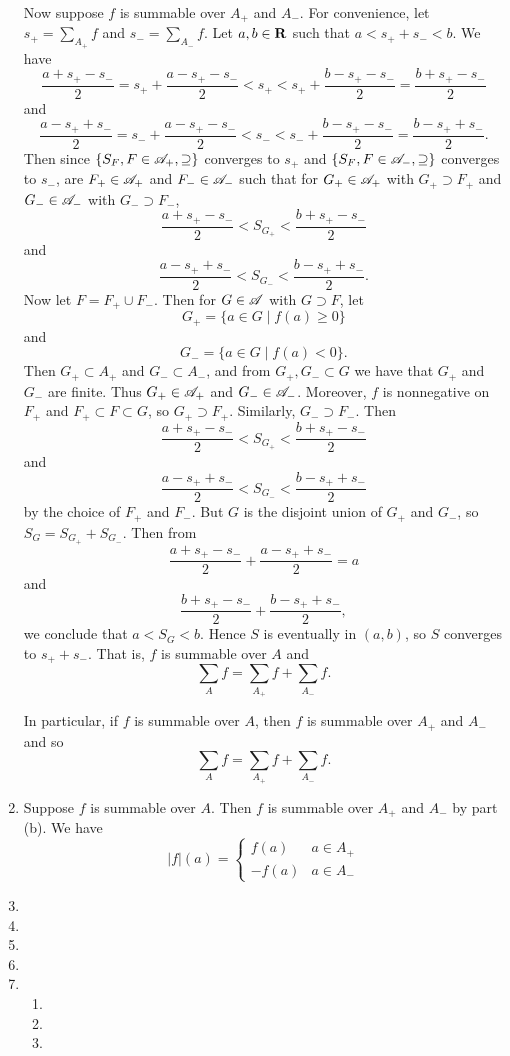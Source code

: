 \begin{prob}
\begin{enumerate}
Now suppose $f$ is summable over $A_+$ and $A_-$. For convenience, let $s_+ = \sum_{A_+}f$ and $s_- = \sum_{A_-}f$. Let $a, b \in \mathbf{R}$ such that $a < s_+ + s_- < b$. We have \[\frac{a + s_+ - s_-}{2} =  s_+ + \frac{a - s_+ - s_-}{2}  < s_+ < s_+ + \frac{b - s_+ - s_-}{2} = \frac{b + s_+ - s_-}{2}\] and \[\frac{a - s_+ + s_-}{2} = s_- + \frac{a - s_+ - s_-}{2} < s_- < s_- + \frac{b - s_+ - s_-}{2} = \frac{b - s_+ + s_-}{2}.\] Then since $\{S_F, F \in \mathscr{A}_+, \supseteq\}$ converges to $s_+$ and $\{S_F, F \in \mathscr{A}_-, \supseteq\}$ converges to $s_-$, are $F_+ \in \mathscr{A}_+$ and $F_- \in \mathscr{A}_-$ such that for $G_+ \in \mathscr{A}_+$ with $G_+ \supset F_+$ and $G_- \in \mathscr{A}_-$ with $G_- \supset F_-$, \[\frac{a + s_+ - s_-}{2} < S_{G_+} < \frac{b + s_+ - s_-}{2}\] and \[\frac{a - s_+ + s_-}{2} < S_{G_-} < \frac{b - s_+ + s_-}{2}.\] Now let $F = F_+ \cup F_-$. Then for $G \in \mathscr{A}$ with $G \supset F$, let \[G_+ = \{a \in G\mid f(a) \geq 0\}\] and \[G_- = \{a \in G\mid f(a) < 0\}.\] Then $G_+ \subset A_+$ and $G_- \subset A_-$, and from $G_+, G_- \subset G$ we have that $G_+$ and $G_-$ are finite. Thus $G_+ \in \mathscr{A}_+$ and $G_- \in \mathscr{A}_-$. Moreover, $f$ is nonnegative on $F_+$ and $F_+ \subset F \subset G$, so $G_+ \supset F_+$. Similarly, $G_- \supset F_-$. Then \[\frac{a + s_+ - s_-}{2} < S_{G_+} < \frac{b + s_+ - s_-}{2}\] and \[\frac{a - s_+ + s_-}{2} < S_{G_-} < \frac{b - s_+ + s_-}{2}\] by the choice of $F_+$ and $F_-$. But $G$ is the disjoint union of $G_+$ and $G_-$, so $S_G = S_{G_+} + S_{G_-}$. Then from \[\frac{a + s_+ - s_-}{2} + \frac{a - s_+ + s_-}{2} = a\] and \[\frac{b + s_+ - s_-}{2} + \frac{b - s_+ + s_-}{2},\] we conclude that $a < S_G < b$. Hence $S$ is eventually in $(a, b)$, so $S$ converges to $s_+ + s_-$. That is, $f$ is summable over $A$ and \[\sum_A f = \sum_{A_+}f + \sum_{A_-}f.\]

In particular, if $f$ is summable over $A$, then $f$ is summable over $A_+$ and $A_-$ and so \[\sum_Af = \sum_{A_+}f + \sum_{A_-}f.\]

\item Suppose $f$ is summable over $A$. Then $f$ is summable over $A_+$ and $A_-$ by part (b). We have \[|f|(a) = \begin{cases}
f(a) & a \in A_+\\
-f(a) & a \in A_-
\end{cases}\] 

\item 

\item 

\item 

\item 

\item
\begin{enumerate}[label = (\roman*)]
\item 

\item 

\item 
\end{enumerate}
\end{enumerate}
\end{prob}

